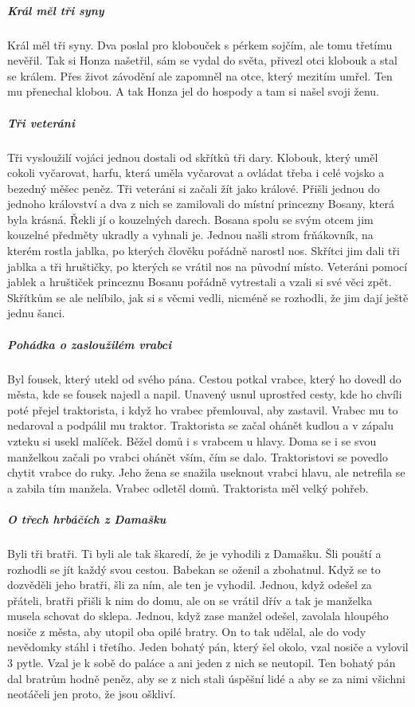 {{\subparagraph{Král měl tři syny}
	Král měl tři syny. Dva poslal pro klobouček s pérkem sojčím, ale tomu třetímu
	nevěřil. Tak si Honza našetřil, sám se vydal do světa, přivezl otci klobouk a
	stal se králem. Přes život závodění ale zapomněl na otce, který mezitím umřel.
	Ten mu přenechal klobou. A tak Honza jel do hospody a tam si našel svoji ženu.

\subparagraph{Tři veteráni}
	Tři vysloužilí vojáci jednou dostali od skřítků tři dary. Klobouk, který uměl
	cokoli vyčarovat, harfu, která uměla vyčarovat a ovládat třeba i celé vojsko a
	bezedný měšec peněz. Tři veteráni si začali žít jako králové. Přišli jednou do
	jednoho království a dva z nich se zamilovali do místní princezny Bosany, která
	byla krásná. Řekli jí o kouzelných darech. Bosana spolu se svým otcem jim
	kouzelné předměty ukradly a vyhnali je. Jednou našli strom frňákovník, na
	kterém rostla jablka, po kterých člověku pořádně narostl nos. Skřítci jim dali
	tři jablka a tři hruštičky, po kterých se vrátil nos na původní místo. Veteráni
	pomocí jablek a hruštiček princeznu Bosanu pořádně vytrestali a vzali si své
	věci zpět. Skřítkům se ale nelíbilo, jak si s věcmi vedli, nicméně se rozhodli,
	že jim dají ještě jednu šanci.

\subparagraph{Pohádka o zasloužilém vrabci}
	Byl fousek, který utekl od svého pána. Cestou potkal vrabce, který ho dovedl do
	města, kde se fousek najedl a napil. Unavený usnul uprostřed cesty, kde ho
	chvíli poté přejel traktorista, i když ho vrabec přemlouval, aby zastavil.
	Vrabec mu to nedaroval a podpálil mu traktor. Traktorista se začal ohánět
	kudlou a v zápalu vzteku si usekl malíček. Běžel domů i s vrabcem u hlavy. Doma
	se i se svou  manželkou začali po vrabci ohánět vším, čím se
	dalo. Traktoristovi se povedlo chytit vrabce do ruky. Jeho žena se snažila
	useknout vrabci hlavu, ale netrefila se a zabila tím manžela. Vrabec odletěl
	domů. Traktorista měl velký pohřeb.

\subparagraph{O třech hrbáčích z Damašku}
	Byli tři bratři. Ti byli ale tak škaredí, že je vyhodili z Damašku. Šli pouští
	a rozhodli se jít každý svou cestou. Babekan se oženil a zbohatnul. Když se to
	dozvěděli jeho bratři, šli za ním, ale ten je vyhodil. Jednou, když odešel za
	přáteli, bratři přišli k nim do domu, ale on se vrátil dřív a tak je manželka
	musela schovat do sklepa. Jednou, když zase manžel odešel, zavolala hloupého
	nosiče z města, aby utopil oba opilé bratry. On to tak udělal, ale do vody
	nevědomky stáhl i třetího. Jeden bohatý pán, který šel okolo, vzal nosiče a
	vylovil 3 pytle. Vzal je k sobě do paláce a ani jeden z nich se neutopil. Ten
	bohatý pán dal bratrům hodně peněz, aby se z nich stali úspěšní lidé a aby se
	za nimi všichni neotáčeli jen proto, že jsou oškliví.

}}

